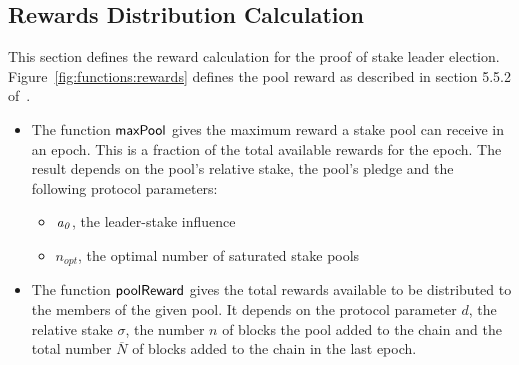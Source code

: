 \subsection{Rewards Distribution Calculation}
\label{sec:reward-dist}

This section defines the reward calculation for the proof of stake leader election.
Figure~\ref{fig:functions:rewards} defines the pool reward as described in section
5.5.2 of~\cite{delegation_design}.

\begin{itemize}
  \item The function $\mathsf{maxPool}$ gives the maximum reward a stake pool can receive in an epoch.
    This is a fraction of the total available rewards for the epoch.
    The result depends on the pool's relative stake, the pool's pledge and the following
    protocol parameters:
    \begin{itemize}
      \item $\mathit{a_0}$, the leader-stake influence
      \item $n_{opt}$, the optimal number of saturated stake pools
    \end{itemize}
  \item The function $\mathsf{poolReward}$ gives the total rewards available to be
    distributed to the members of the given pool. It depends on the protocol parameter $d$,
    the relative stake $\sigma$, the number $n$ of blocks the pool added to the chain and the
    total number $\overline{N}$ of blocks added to the chain in the last epoch.

\end{itemize}


